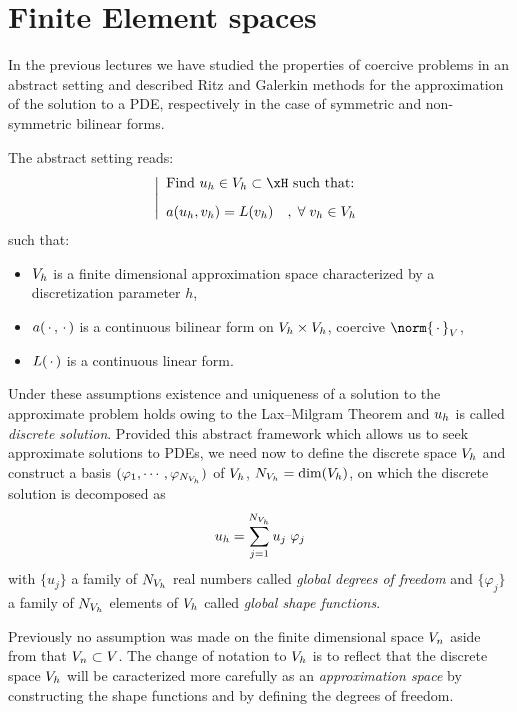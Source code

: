 
\chapter{Finite Element spaces}\label{sec:fem}

In the previous lectures we have studied the properties of coercive problems in an abstract setting and described Ritz and Galerkin methods for the approximation of the solution to a PDE, respectively in the case of symmetric and non-symmetric bilinear forms.

\medskip
The abstract setting reads:
\begin{equation*}
\left\lvert
\begin{array}{l}
\mbox{Find $\uh\in\xVh\subset \xH$ such that:}\\[2ex]
a(\uh,\vh) = L(\vh)\quad,\;\forany  \vh \in \xVh
\end{array}
\right.
\end{equation*}
such that:
\begin{itemize}
\item ${{V}}_h$ is a finite dimensional approximation space characterized by a discretization parameter $h$,
\item $a(\,{\mathbf\cdot}\,,\,{\mathbf\cdot}\,)$ is a continuous bilinear form on ${{V}}_h\times{{V}}_h$, coercive \wrt $\norm{\xDot}_{\xV}$,
\item $L(\,{\mathbf\cdot}\,)$ is a continuous linear form.
\end{itemize}

Under these assumptions existence and uniqueness of a solution to the approximate problem holds owing to the Lax--Milgram Theorem and ${u_h}$ is called \textit{discrete solution}.
Provided this abstract framework which allows us to seek approximate solutions to PDEs, we need now to define the discrete space ${{V}}_h$ and construct a basis $(\varphi_1,\cdots,\varphi_{{N_{{{V}}_h}}})$ of ${{V}}_h$, ${N_{{{V}}_h}} = \dim({{V}}_h)$, on which the discrete solution is decomposed as
\begin{equation*}
{u_h} = \sum_{j=1}^{{N_{{{V}}_h}}} u_j\; \varphi_j
\end{equation*}
with $\lbrace u_j \rbrace$ a family of ${N_{{{V}}_h}}$ real numbers called \textit{global degrees of freedom} and $\lbrace \varphi_j \rbrace$ a family of ${N_{{{V}}_h}}$ elements of ${{V}}_h$ called \textit{global shape functions}.

\medskip
Previously no assumption was made on the finite dimensional space ${V}_n$ aside from that ${V}_n \subset {V}$.
The change of notation to ${V}_h$ is to reflect that the discrete space ${V}_h$ will be caracterized more carefully as an \textit{approximation space} by constructing the shape functions and by defining the degrees of freedom.

